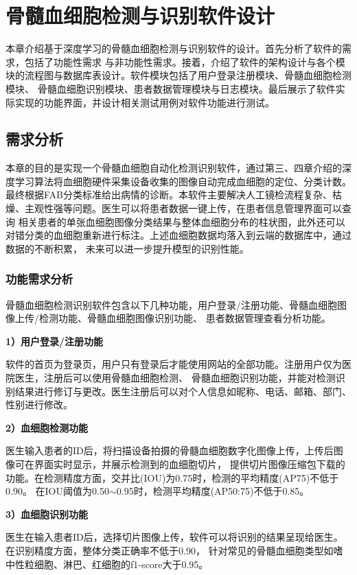 \chapter{骨髓血细胞检测与识别软件设计}
本章介绍基于深度学习的骨髓血细胞检测与识别软件的设计。首先分析了软件的需求，包括了功能性需求
与非功能性需求。接着，介绍了软件的架构设计与各个模块的流程图与数据库表设计。软件模块包括了用户登录注册模块、骨髓血细胞检测模块、
骨髓血细胞识别模块、患者数据管理模块与日志模块。最后展示了软件实际实现的功能界面，并设计相关测试用例对软件功能进行测试。


\section{需求分析}
本章的目的是实现一个骨髓血细胞自动化检测识别软件，通过第三、四章介绍的深度学习算法将血细胞硬件采集设备收集的图像自动完成血细胞的定位、分类计数。
最终根据FAB分类标准给出病情的诊断。本软件主要解决人工镜检流程复杂、枯燥、主观性强等问题。医生可以将患者数据一键上传，在患者信息管理界面可以查询
相关患者的单张血细胞图像分类结果与整体血细胞分布的柱状图，此外还可以对错分类的血细胞重新进行标注。上述血细胞数据均落入到云端的数据库中，通过数据的不断积累，
未来可以进一步提升模型的识别性能。

\subsection{功能需求分析}
骨髓血细胞检测识别软件包含以下几种功能，用户登录/注册功能、骨髓血细胞图像上传/检测功能、骨髓血细胞图像识别功能、
患者数据管理查看分析功能。

\textbf{1）用户登录/注册功能}

软件的首页为登录页，用户只有登录后才能使用网站的全部功能。注册用户仅为医院医生，注册后可以使用骨髓血细胞检测、
骨髓血细胞识别功能，并能对检测识别结果进行修订与更改。医生注册后可以对个人信息如昵称、电话、邮箱、部门、性别进行修改。

\textbf{2）血细胞检测功能}

医生输入患者的ID后，将扫描设备拍摄的骨髓血细胞数字化图像上传，上传后图像可在界面实时显示，并展示检测到的血细胞切片，
提供切片图像压缩包下载的功能。在检测精度方面，交并比(IOU)为0.75时，检测的平均精度(AP75)不低于0.90。
在IOU阈值为0.50$\sim$0.95时，检测平均精度(AP50:75)不低于0.85。


\textbf{3）血细胞识别功能}

医生在输入患者ID后，选择切片图像上传，软件可以将识别的结果呈现给医生。在识别精度方面，整体分类正确率不低于0.90，
针对常见的骨髓血细胞类型如嗜中性粒细胞、淋巴、红细胞的f1-score大于0.95。

